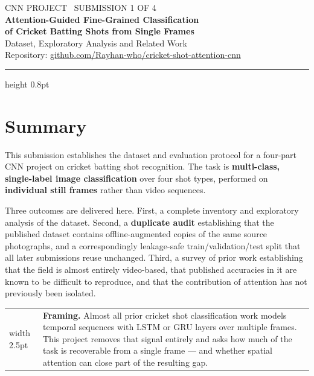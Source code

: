 \documentclass[11pt,a4paper]{article}
\makeatletter
\newenvironment{keybox}
  {\par\medskip\noindent\begin{tabular}{@{}p{0.3em}@{\hspace{0.8em}}p{\dimexpr\linewidth-2.2em}@{}}
   {\color{accent}\vrule width 2.5pt} &}
  {\end{tabular}\par\medskip}
\makeatother
\begin{document}
\begin{center}
{\color{muted}\small CNN PROJECT \textbullet\ SUBMISSION 1 OF 4}\\[0.9em]
{\LARGE\bfseries\color{accent} Attention-Guided Fine-Grained Classification\\[0.25em]
of Cricket Batting Shots from Single Frames}\\[1.1em]
{\large Dataset, Exploratory Analysis and Related Work}\\[1.4em]
{\color{muted}\small
Repository: \href{https://github.com/Rayhan-who/cricket-shot-attention-cnn}{github.com/Rayhan-who/cricket-shot-attention-cnn}}
\end{center}

\vspace{0.6em}
{\hrule height 0.8pt}
\vspace{1.2em}

\section*{Summary}

This submission establishes the dataset and evaluation protocol for a four-part CNN
project on cricket batting shot recognition. The task is \textbf{multi-class,
single-label image classification} over four shot types, performed on
\textbf{individual still frames} rather than video sequences.

Three outcomes are delivered here. First, a complete inventory and exploratory analysis
of the dataset. Second, a \textbf{duplicate audit} establishing that the published
dataset contains offline-augmented copies of the same source photographs, and a
correspondingly leakage-safe train/validation/test split that all later submissions
reuse unchanged. Third, a survey of prior work establishing that the field is almost
entirely video-based, that published accuracies in it are known to be difficult to
reproduce, and that the contribution of attention has not previously been isolated.

\begin{keybox}
\textbf{Framing.} Almost all prior cricket shot classification work models temporal
sequences with LSTM or GRU layers over multiple frames. This project removes that signal
entirely and asks how much of the task is recoverable from a single frame --- and
whether spatial attention can close part of the resulting gap.
\end{keybox}
\end{document}
